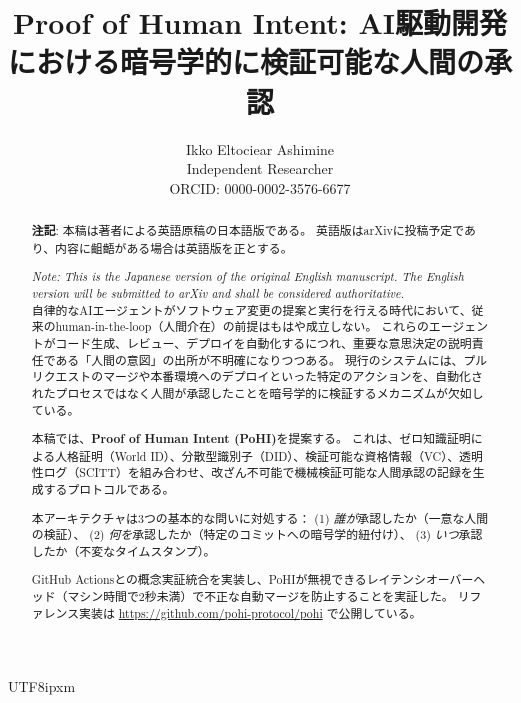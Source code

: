 \documentclass[a4paper,10pt]{article}
\begin{document}
\begin{CJK}{UTF8}{ipxm}

\title{\textbf{Proof of Human Intent: AI駆動開発における暗号学的に検証可能な人間の承認}}

\author{
Ikko Eltociear Ashimine \\
Independent Researcher \\
ORCID: 0000-0002-3576-6677
}

\date{}
\maketitle

\begin{abstract}
\noindent
\textbf{注記}: 本稿は著者による英語原稿の日本語版である。
英語版はarXivに投稿予定であり、内容に齟齬がある場合は英語版を正とする。

\textit{Note: This is the Japanese version of the original English manuscript.
The English version will be submitted to arXiv and shall be considered authoritative.} \\

\noindent
自律的なAIエージェントがソフトウェア変更の提案と実行を行える時代において、従来のhuman-in-the-loop（人間介在）の前提はもはや成立しない。
これらのエージェントがコード生成、レビュー、デプロイを自動化するにつれ、重要な意思決定の説明責任である「人間の意図」の出所が不明確になりつつある。
現行のシステムには、プルリクエストのマージや本番環境へのデプロイといった特定のアクションを、自動化されたプロセスではなく人間が承認したことを暗号学的に検証するメカニズムが欠如している。

本稿では、\textbf{Proof of Human Intent (PoHI)}を提案する。
これは、ゼロ知識証明による人格証明（World ID）、分散型識別子（DID）、検証可能な資格情報（VC）、透明性ログ（SCITT）を組み合わせ、改ざん不可能で機械検証可能な人間承認の記録を生成するプロトコルである。

本アーキテクチャは3つの基本的な問いに対処する：
(1) \textit{誰が}承認したか（一意な人間の検証）、
(2) \textit{何を}承認したか（特定のコミットへの暗号学的紐付け）、
(3) \textit{いつ}承認したか（不変なタイムスタンプ）。

GitHub Actionsとの概念実証統合を実装し、PoHIが無視できるレイテンシオーバーヘッド（マシン時間で2秒未満）で不正な自動マージを防止することを実証した。
リファレンス実装は \url{https://github.com/pohi-protocol/pohi} で公開している。
\end{abstract}


\end{CJK}
\end{document}
